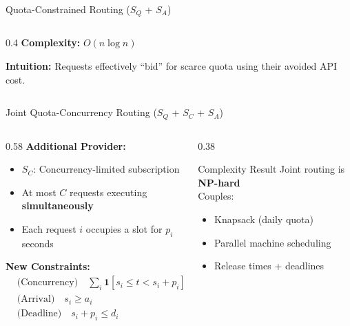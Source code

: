 \documentclass[aspectratio=169,10pt]{beamer}
\begin{document}
\begin{frame}{Quota-Constrained Routing ($S_Q$ + $S_A$)}
\begin{columns}[T]
\begin{column}{0.4\textwidth}
\vspace{0.1cm}
\small
\textcolor{icmlgreen}{\textbf{Complexity:}} $O(n \log n)$

\vspace{0.1cm}
\textcolor{icmlblue}{\textbf{Intuition:}} Requests effectively ``bid'' for scarce quota using their avoided API cost.
\end{column}
\end{columns}
\end{frame}

\begin{frame}{Joint Quota-Concurrency Routing ($S_Q$ + $S_C$ + $S_A$)}
\begin{columns}[T]
\begin{column}{0.58\textwidth}
\textbf{Additional Provider:}
\begin{itemize}
    \item $S_C$: Concurrency-limited subscription
    \item At most $C$ requests executing \textbf{simultaneously}
    \item Each request $i$ occupies a slot for $p_i$ seconds
\end{itemize}

\vspace{0.3cm}
\textbf{New Constraints:}
\begin{align*}
&\text{(Concurrency)} \quad \sum_{i} \mathbf{1}[s_i \leq t < s_i + p_i] \cdot x_i^C \leq C \\
&\text{(Arrival)} \quad s_i \geq a_i \\
&\text{(Deadline)} \quad s_i + p_i \leq d_i
\end{align*}

\end{column}

\begin{column}{0.38\textwidth}
\begin{alertblock}{Complexity Result}
Joint routing is \alert{\textbf{NP-hard}}\\[0.2cm]
\small
Couples:
\begin{itemize}
    \item Knapsack (daily quota)
    \item Parallel machine scheduling
    \item Release times + deadlines
\end{itemize}
\end{alertblock}


\end{column}
\end{columns}
\end{frame}
\end{document}
